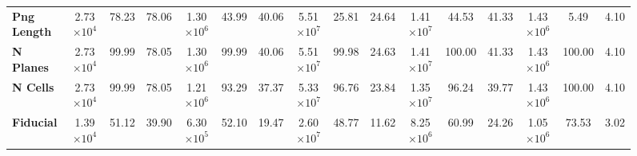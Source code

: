 \begin{sidewaysfigure}[!hb]
\begin{scriptsize}
\begin{tabular}{|l|ccc|ccc|ccc|ccc|ccc|}
\textbf{Png Length} & 2.73$\times 10^4$           & 78.23                                                               & 78.06                                      & 1.30$\times 10^6$             & 43.99                                                                 & 40.06                                        & 5.51$\times 10^7$          & 25.81                                                                  & 24.64                                         & 1.41$\times 10^7$                   & 44.53                                                              & 41.33                                     & 1.43$\times 10^6$             & 5.49                                                                  & 4.10                                         \\
\textbf{N Planes}       & 2.73$\times 10^4$           & 99.99                                                               & 78.05                                      & 1.30$\times 10^6$             & 99.99                                                                 & 40.06                                        & 5.51$\times 10^7$          & 99.98                                                                  & 24.63                                         & 1.41$\times 10^7$                   & 100.00                                                             & 41.33                                     & 1.43$\times 10^6$             & 100.00                                                                & 4.10                                         \\
\textbf{N Cells}        & 2.73$\times 10^4$           & 99.99                                                               & 78.05                                      & 1.21$\times 10^6$             & 93.29                                                                 & 37.37                                        & 5.33$\times 10^7$          & 96.76                                                                  & 23.84                                         & 1.35$\times 10^7$                   & 96.24                                                              & 39.77                                     & 1.43$\times 10^6$             & 100.00                                                                & 4.10                                         \\
\textbf{Fiducial}     & 1.39$\times 10^4$           & 51.12                                                               & 39.90                                      & 6.30$\times 10^5$ & 52.10                                                                 & 19.47                                        & 2.60$\times 10^7$          & 48.77                                                                  & 11.62                                         & 8.25$\times 10^6$          & 60.99                                                              & 24.26                                     & 1.05$\times 10^6$             & 73.53                                                                 & 3.02                                         \\

\end{tabular}
\end{scriptsize}
\end{sidewaysfigure}
